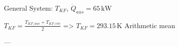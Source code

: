 General System: \( T_{KF} \), \( \dot{Q}_{aus} = 65 \, \text{kW} \)  

\( T_{KF} = \frac{T_{KF,aus} + T_{KF,ein}}{2} \)  
=> \( T_{KF} = 293.15 \, \text{K} \)  
Arithmetic mean  

---